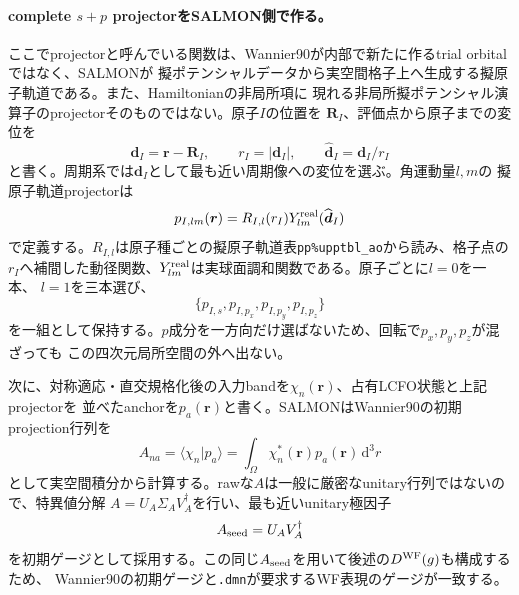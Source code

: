 \documentclass[11pt,a4paper]{article}
\newcommand{\dd}{\mathrm d}
\newcommand{\code}[1]{\texttt{#1}}
\begin{document}
\paragraph{complete $s+p$ projectorをSALMON側で作る。}
ここでprojectorと呼んでいる関数は、Wannier90が内部で新たに作るtrial orbitalではなく、SALMONが
擬ポテンシャルデータから実空間格子上へ生成する擬原子軌道である。また、Hamiltonianの非局所項に
現れる非局所擬ポテンシャル演算子のprojectorそのものではない。原子$I$の位置を
$\boldsymbol R_I$、評価点から原子までの変位を
\begin{equation}
 \boldsymbol d_I=\boldsymbol r-\boldsymbol R_I,
 \qquad r_I=|\boldsymbol d_I|,
 \qquad \widehat{\boldsymbol d}_I=\boldsymbol d_I/r_I
 \label{eq:sp-projector-relative-coordinate}
\end{equation}
と書く。周期系では$\boldsymbol d_I$として最も近い周期像への変位を選ぶ。角運動量$l,m$の
擬原子軌道projectorは
\begin{equation}
 p_{I,lm}(\boldsymbol r)=R_{I,l}(r_I)Y_{lm}^{\rm real}(\widehat{\boldsymbol d}_I)
 \label{eq:sp-projector-definition}
\end{equation}
で定義する。$R_{I,l}$は原子種ごとの擬原子軌道表\code{pp\%upptbl\_ao}から読み、格子点の
$r_I$へ補間した動径関数、$Y_{lm}^{\rm real}$は実球面調和関数である。原子ごとに$l=0$を一本、
$l=1$を三本選び、
\begin{equation}
 \{p_{I,s},p_{I,p_x},p_{I,p_y},p_{I,p_z}\}
 \label{eq:complete-sp-projector-shell}
\end{equation}
を一組として保持する。$p$成分を一方向だけ選ばないため、回転で$p_x,p_y,p_z$が混ざっても
この四次元局所空間の外へ出ない。

次に、対称適応・直交規格化後の入力bandを$\chi_n(\boldsymbol r)$、占有LCFO状態と上記projectorを
並べたanchorを$p_a(\boldsymbol r)$と書く。SALMONはWannier90の初期projection行列を
\begin{equation}
 A_{na}=\langle\chi_n|p_a\rangle
 =\int_\Omega\chi_n^*(\boldsymbol r)p_a(\boldsymbol r)\,\dd^3r
 \label{eq:wannier-seed-a-matrix}
\end{equation}
として実空間積分から計算する。rawな$A$は一般に厳密なunitary行列ではないので、特異値分解
$A=U_A\Sigma_AV_A^\dagger$を行い、最も近いunitary極因子
\begin{equation}
 A_{\rm seed}=U_AV_A^\dagger
 \label{eq:wannier-seed-polar-factor}
\end{equation}
を初期ゲージとして採用する。この同じ$A_{\rm seed}$を用いて後述の$D^{\rm WF}(g)$も構成するため、
Wannier90の初期ゲージと\code{.dmn}が要求するWF表現のゲージが一致する。
\end{document}
